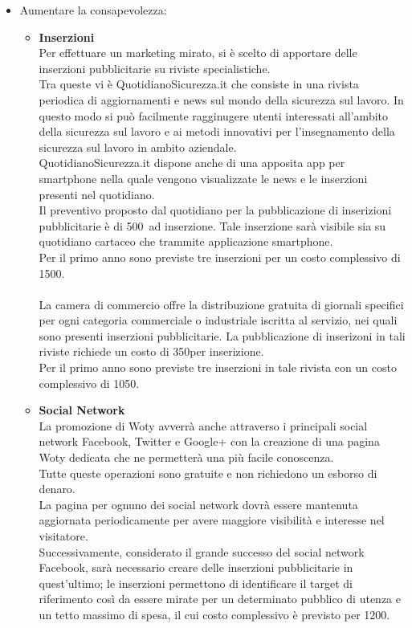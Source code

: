 \begin{itemize}
\item Aumentare la consapevolezza:
\begin{itemize}
\item \textbf{Inserzioni}\\
Per effettuare un marketing mirato, si è scelto di apportare delle inserzioni pubblicitarie su riviste specialistiche.
\\
Tra queste vi è QuotidianoSicurezza.it che consiste in una rivista periodica di aggiornamenti e news sul mondo della sicurezza sul lavoro. In questo modo si può facilmente ragginugere utenti interessati all'ambito della sicurezza sul lavoro e ai metodi innovativi per l'insegnamento della sicurezza sul lavoro in ambito aziendale.\\
QuotidianoSicurezza.it dispone anche di una apposita app per smartphone nella quale vengono visualizzate le news e le inserzioni presenti nel quotidiano.\\
Il preventivo proposto dal quotidiano per la pubblicazione di inserizioni pubblicitarie è di 500\EUR\ ad inserzione. Tale inserzione sarà visibile sia su quotidiano cartaceo che trammite applicazione smartphone.\\ Per il primo anno sono previste tre inserzioni per un costo complessivo di 1500\EUR.\\
\\
La camera di commercio offre la distribuzione gratuita di giornali specifici per ogni categoria commerciale o industriale iscritta al servizio, nei quali sono presenti inserzioni pubblicitarie. La pubblicazione di inserizoni in tali riviste richiede un costo di 350\EUR per inserizione.\\
Per il primo anno sono previste tre inserzioni in tale rivista con un costo complessivo di 1050\EUR.\\

\item \textbf{Social Network}\\
La promozione di Woty avverrà anche attraverso i principali social network Facebook, Twitter e Google+ con la creazione di una pagina Woty dedicata che ne permetterà una più facile conoscenza.\\
Tutte queste operazioni sono gratuite e non richiedono un esborso di denaro.\\
La pagina per ognuno dei social network dovrà essere mantenuta aggiornata periodicamente per avere maggiore visibilità e interesse nel visitatore.\\
Successivamente, considerato il grande successo del social network Facebook, sarà necessario creare delle inserzioni pubblicitarie in quest'ultimo; le inserzioni permettono di identificare il target di riferimento così da essere mirate per un determinato pubblico di utenza e un tetto massimo di spesa, il cui costo complessivo è previsto per 1200\EUR.


\end{itemize}
\end{itemize}
